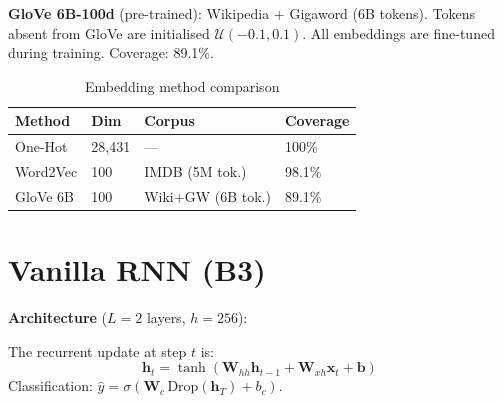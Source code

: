 \documentclass[10pt,a4paper,twocolumn]{article}
\begin{document}
\textbf{GloVe 6B-100d} (pre-trained): Wikipedia + Gigaword (6B tokens).
Tokens absent from GloVe are initialised $\mathcal{U}(-0.1,0.1)$.
All embeddings are fine-tuned during training. Coverage: 89.1\%.

\begin{table}[H]
\centering\small
\caption{Embedding method comparison}
\begin{tabular}{llll}
\toprule
Method & Dim & Corpus & Coverage\\
\midrule
One-Hot  & 28,431 & — & 100\%\\
Word2Vec & 100    & IMDB (5M tok.) & 98.1\%\\
GloVe 6B & 100    & Wiki+GW (6B tok.) & 89.1\%\\
\bottomrule
\end{tabular}
\label{tab:emb}
\end{table}

\section{Vanilla RNN (B3)}

\textbf{Architecture} ($L=2$ layers, $h=256$):

\begin{center}
\end{center}

The recurrent update at step $t$ is:
\begin{equation}
  \mathbf{h}_t = \tanh\!\left(\mathbf{W}_{hh}\mathbf{h}_{t-1}
                + \mathbf{W}_{xh}\mathbf{x}_t + \mathbf{b}\right)
\end{equation}
Classification: $\hat{y}=\sigma(\mathbf{W}_c\,\text{Drop}(\mathbf{h}_T)+b_c)$.
\end{document}
